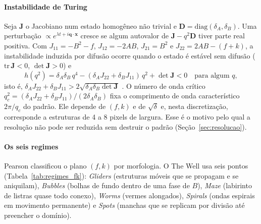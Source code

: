 \paragraph{Instabilidade de Turing} Seja $\mathbf{J}$ o Jacobiano num estado homogêneo não
trivial e $\mathbf{D}=\mathrm{diag}(\delta_A,\delta_B)$. Uma perturbação
$\propto e^{\lambda t + i\mathbf{q}\cdot\mathbf{x}}$ cresce se algum autovalor de
$\mathbf{J}-q^2\mathbf{D}$ tiver parte real positiva. Com
$J_{11} = -B^2 - f$, $J_{12} = -2AB$, $J_{21} = B^2$ e $J_{22} = 2AB - (f+k)$, a instabilidade
induzida por difusão ocorre quando o estado é estável sem difusão
($\mathrm{tr}\,\mathbf{J}<0$, $\det\mathbf{J}>0$) e
\begin{equation}
  h(q^2) = \delta_A\delta_B\, q^4 - (\delta_A J_{22} + \delta_B J_{11})\, q^2 + \det\mathbf{J} < 0
  \quad\text{para algum } q,
\end{equation}
isto é, $\delta_A J_{22} + \delta_B J_{11} > 2\sqrt{\delta_A\delta_B\det\mathbf{J}}$
\cite{turing1952,murray2003,cross2009}. O número de onda crítico
$q_c^2 = (\delta_A J_{22} + \delta_B J_{11})/(2\delta_A\delta_B)$ fixa o comprimento de onda
característico $2\pi/q_c$ do padrão. Ele depende de $(f,k)$ e de $\sqrt{\delta}$ e, nesta
discretização, corresponde a estruturas de 4 a 8 pixels de largura. Esse é o motivo pelo qual a
resolução não pode ser reduzida sem destruir o padrão (Seção~\ref{sec:resolucao}).

\paragraph{Os seis regimes} Pearson \cite{pearson1993} classificou o plano $(f,k)$ por
morfologia. O The Well usa seis pontos (Tabela~\ref{tab:regimes_fk}): \emph{Gliders}
(estruturas móveis que se propagam e se aniquilam), \emph{Bubbles} (bolhas de fundo dentro de uma
fase de $B$), \emph{Maze} (labirinto de listras quase todo conexo), \emph{Worms} (vermes
alongados), \emph{Spirals} (ondas espirais em movimento permanente) e \emph{Spots} (manchas que se
replicam por divisão até preencher o domínio).

